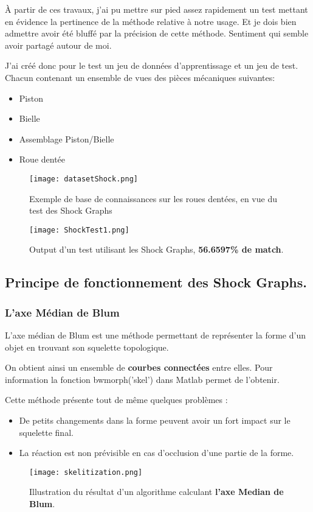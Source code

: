 À partir de ces travaux, j'ai pu mettre sur pied assez rapidement un test mettant en évidence la pertinence de la méthode relative à notre usage. Et je dois bien admettre avoir été bluffé par la précision de cette méthode. Sentiment qui semble avoir partagé autour de moi.

J'ai créé donc pour le test un jeu de données d'apprentissage et un jeu de test. Chacun contenant un ensemble de vues des pièces mécaniques suivantes:
\begin{itemize}
	\item 	Piston
	\item	Bielle
	\item	Assemblage Piston/Bielle
	\item	Roue dentée
\end{itemize}
\vspace{5mm}

\begin{figure}[H]
    \centering
    \texttt{[image: datasetShock.png]}
	\caption{Exemple de base de connaissances sur les roues dentées, en vue du test des Shock Graphs}\label{image.ShockGearDataset} 
\end{figure}
\vspace{-4mm}

\begin{figure}[H]
    \centering
    \texttt{[image: ShockTest1.png]}
	\caption{Output d'un test utilisant les Shock Graphs, \textbf{56.6597\% de match}.}\label{image.ShockTest1} 
\end{figure}


\clearpage

\subsection{Principe de fonctionnement des Shock Graphs.}

\subsubsection{L'axe Médian de Blum}

L'axe médian de Blum est une méthode permettant de représenter la forme d'un objet en trouvant son squelette topologique.

On obtient ainsi un ensemble de \textbf{courbes connectées} entre elles. Pour information la fonction bwmorph('skel') dans Matlab permet de l'obtenir.

Cette méthode présente tout de même quelques problèmes :
\begin{itemize}
	\item De petits changements dans la forme peuvent avoir un fort impact sur le squelette final.
	\item La réaction est non prévisible en cas d'occlusion d'une partie de la forme.
\end{itemize}
\vspace{8mm}
\begin{figure}[H]
    \centering
    \texttt{[image: skelitization.png]}
	\caption{Illustration du résultat d'un algorithme calculant \textbf{l'axe Median de Blum}.}\label{image.skel} 
\end{figure}

